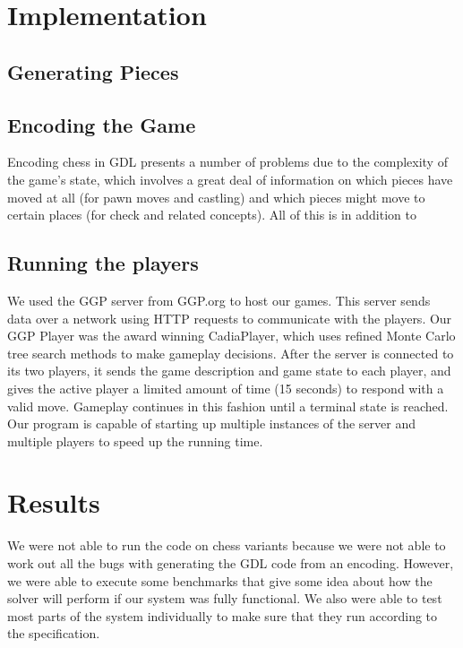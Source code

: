 \documentclass[11pt,letterpaper]{article}
\begin{document}
\section{Implementation}

\subsection{Generating Pieces}

\subsection{Encoding the Game}
Encoding chess in GDL presents a number of problems due to the complexity of the
game's state, which involves a great deal of information on which pieces have
moved at all (for pawn moves and castling) and which pieces might move to
certain places (for check and related concepts). All of this is in addition to 

\subsection{Running the players}
We used the GGP server from GGP.org to host our games. This server sends data over a network using HTTP requests to communicate with the players. Our GGP Player was the award winning CadiaPlayer, which uses refined Monte Carlo tree search methods to make gameplay decisions. After the server is connected to its two players, it sends the game description and game state to each player, and gives the active player a limited amount of time (15 seconds) to respond with a valid move. Gameplay continues in this fashion until a terminal state is reached. Our program is capable of starting up multiple instances of the server and multiple players to speed up the running time.

\section{Results}
We were not able to run the code on chess variants because we were not able to work out all the bugs with generating the GDL code from an encoding. However, we were able to execute some benchmarks that give some idea about how the solver will perform if our system was fully functional. We also were able to test most parts of the system individually to make sure that they run according to the specification.
\end{document}
